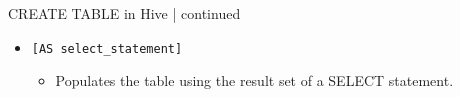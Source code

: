   \begin{frame}{CREATE TABLE in Hive | continued}
	\begin{tcolorbox}[colback=white,colframe=black,title= Part 10: CTAS]
		\small
	\begin{itemize}
	  \item \texttt{[AS select\_statement]}
	  \begin{itemize}
		\item Populates the table using the result set of a SELECT statement.
	  \end{itemize}
	\end{itemize}
	\end{tcolorbox}
  \end{frame}
   












































